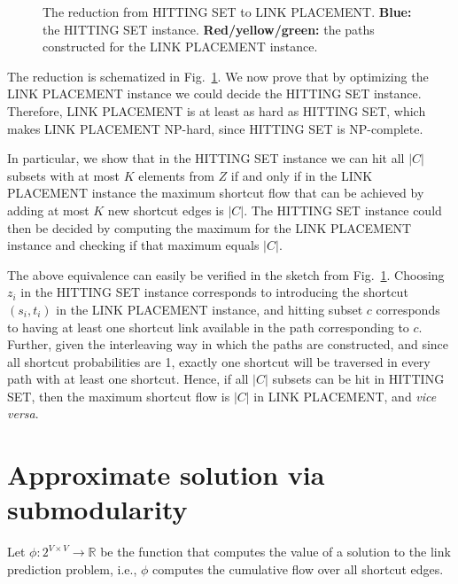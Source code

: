 \documentclass[11pt,letterpaper]{article}
\newcommand{\LP}{LINK PLACEMENT}
\newcommand{\HS}{HITTING SET}
\newcommand{\reals}{\mathbb{R}}
\begin{document}
\begin{figure}

\caption{The reduction from HITTING SET to LINK PLACEMENT.
{\bf Blue:} the HITTING SET instance.
{\bf Red/yellow/green:} the paths constructed for the LINK PLACEMENT instance.
}
 \label{fig:reduction}
\end{figure}

The reduction is schematized in Fig.~\ref{fig:reduction}.
We now prove that by optimizing the \LP{} instance we could decide the \HS{} instance.
Therefore, \LP{} is at least as hard as \HS{}, which makes \LP{} NP-hard, since \HS{} is NP-complete.

In particular, we show that in the \HS{} instance we can hit all $|C|$ subsets with at most $K$ elements from $Z$ if and only if in the \LP{} instance the maximum shortcut flow that can be achieved by adding at most $K$ new shortcut edges is $|C|$.
The \HS{} instance could then be decided by computing the maximum for the \LP{} instance and checking if that maximum equals $|C|$.

The above equivalence can easily be verified in the sketch from Fig.~\ref{fig:reduction}.
Choosing $z_i$ in the \HS{} instance corresponds to introducing the shortcut $(s_i,t_i)$ in the \LP{} instance, and hitting subset $c$ corresponds to having at least one shortcut link available in the path corresponding to $c$.
Further, given the interleaving way in which the paths are constructed, and since all shortcut probabilities are 1, exactly one shortcut will be traversed in every path with at least one shortcut.
Hence, if all $|C|$ subsets can be hit in \HS{}, then the maximum shortcut flow is $|C|$ in \LP{}, and {\it vice versa}.



\section{Approximate solution via submodularity}

Let $\phi : 2^{V \times V} \rightarrow \reals$ be the function that computes the value of a solution to the link prediction problem, i.e., $\phi$ computes the cumulative flow over all shortcut edges.
\end{document}
